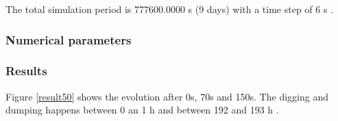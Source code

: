 The total simulation period is 777600.0000 s (9 days)
with a time step of 6 s . 
%
%
\subsubsection{Numerical parameters}
%
%
%
\subsubsection{Results}
%
Figure \ref{result50} shows the evolution after 0s, 70s and 150s. The digging and dumping happens between 0 an 1 h and between 192 and 193 h .

